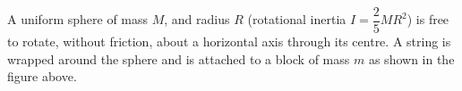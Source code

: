 \documentclass{../../oss-apphys-exam}
\begin{document}
\begin{questions}
%
%
%    
%
  \question A uniform sphere of mass $M$, and radius $R$ (rotational inertia
  $I=\dfrac25MR^2$) is free to rotate, without friction, about a horizontal axis
  through its centre. A string is wrapped around the sphere and is attached to
  a block of mass $m$ as shown in the figure above.
  \begin{parts}

\end{parts}
\end{questions}
\end{document}
